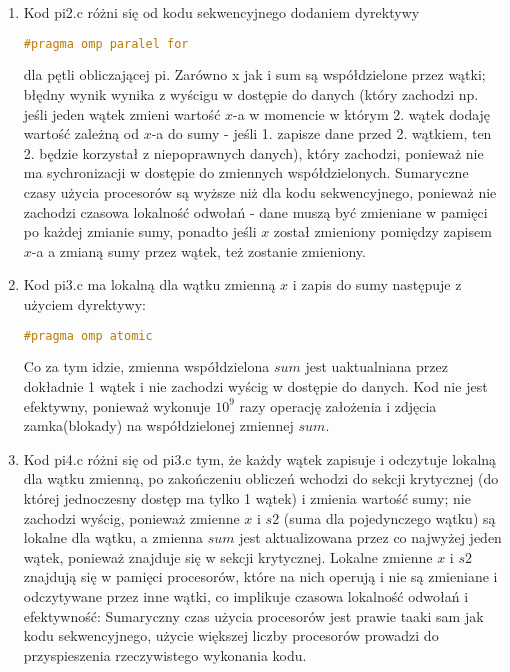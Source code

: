 \documentclass[12pt]{article}
\begin{document}
\begin{enumerate}
	\item Kod pi2.c różni się od kodu sekwencyjnego dodaniem dyrektywy 
	\begin{lstlisting}[language=C]
		#pragma omp paralel for
	\end{lstlisting}
	dla pętli obliczającej pi. Zarówno x jak i sum są współdzielone przez wątki; błędny wynik wynika z wyścigu w dostępie do danych (który zachodzi np. jeśli jeden wątek zmieni wartość $x$-a w momencie w którym 2. wątek dodaję wartość zależną od $x$-a do sumy - jeśli 1. zapisze dane przed 2. wątkiem, ten 2. będzie korzystał z niepoprawnych danych), który zachodzi, ponieważ nie ma sychronizacji w dostępie do zmiennych współdzielonych. Sumaryczne czasy użycia procesorów są wyższe niż dla kodu sekwencyjnego, ponieważ nie zachodzi czasowa lokalność odwołań - dane muszą być zmieniane w pamięci po każdej zmianie sumy, ponadto jeśli $x$ został zmieniony pomiędzy zapisem $x$-a a zmianą sumy przez wątek, też zostanie zmieniony.
	\\
	
	
	\item Kod pi3.c ma lokalną dla wątku zmienną $x$ i zapis do sumy następuje z użyciem dyrektywy:
	\begin{lstlisting}[language=C]
		#pragma omp atomic
	\end{lstlisting}
	Co za tym idzie, zmienna współdzielona $sum$ jest uaktualniana przez dokładnie 1 wątek i nie zachodzi wyścig w dostępie do danych. Kod nie jest efektywny, ponieważ wykonuje $10^{9}$ razy operację założenia i zdjęcia zamka(blokady) na współdzielonej zmiennej $sum$.
	
	\item Kod pi4.c różni się od pi3.c tym, że każdy wątek zapisuje i odczytuje lokalną dla wątku zmienną, po zakończeniu obliczeń wchodzi do sekcji krytycznej (do której jednoczesny dostęp ma tylko 1 wątek) i zmienia wartość sumy; nie zachodzi wyścig, ponieważ zmienne $x$ i $s2$ (suma dla pojedynczego wątku) są lokalne dla wątku, a zmienna $sum$ jest aktualizowana przez co najwyżej jeden wątek, ponieważ znajduje się w sekcji krytycznej. Lokalne zmienne $x$ i $s2$ znajdują się w pamięci procesorów, które na nich operują i nie są zmieniane i odczytywane przez inne wątki, co implikuje czasowa lokalność odwołań i efektywność: Sumaryczny czas użycia procesorów jest prawie taaki sam jak kodu sekwencyjnego, użycie większej liczby procesorów prowadzi do przyspieszenia rzeczywistego wykonania kodu.\\
	

\end{enumerate}
\end{document}
